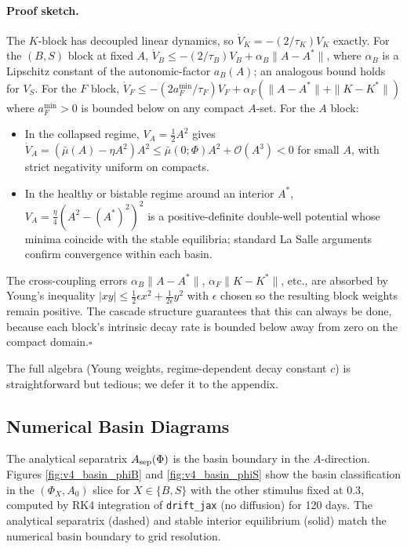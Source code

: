 \paragraph{Proof sketch.}
The $K$-block has decoupled linear dynamics, so $\dot V_K = -(2/\tau_K) V_K$ exactly. For the $(B, S)$ block at fixed $A$, $\dot V_B \le -(2/\tau_B) V_B + \alpha_B \|A - A^*\|$, where $\alpha_B$ is a Lipschitz constant of the autonomic-factor $a_B(A)$; an analogous bound holds for $V_S$. For the $F$ block, $\dot V_F \le -(2 a_F^{\min}/\tau_F) V_F + \alpha_F (\|A - A^*\| + \|K - K^*\|)$ where $a_F^{\min} > 0$ is bounded below on any compact $A$-set. For the $A$ block:
\begin{itemize}
  \item In the collapsed regime, $V_A = \tfrac12 A^2$ gives $\dot V_A = (\bar\mu(A) - \eta A^2) A^2 \le \bar\mu(0;\Phi) A^2 + \mathcal{O}(A^3) < 0$ for small $A$, with strict negativity uniform on compacts.
  \item In the healthy or bistable regime around an interior $A^*$, $V_A = \tfrac{\eta}{4}(A^2 - (A^*)^2)^2$ is a positive-definite double-well potential whose minima coincide with the stable equilibria; standard La Salle arguments confirm convergence within each basin.
\end{itemize}
The cross-coupling errors $\alpha_B \|A-A^*\|$, $\alpha_F \|K - K^*\|$, etc., are absorbed by Young's inequality $|xy| \le \tfrac12 \epsilon x^2 + \tfrac{1}{2\epsilon} y^2$ with $\epsilon$ chosen so the resulting block weights remain positive. The cascade structure guarantees that this can always be done, because each block's intrinsic decay rate is bounded below away from zero on the compact domain.\hfill$\square$

The full algebra (Young weights, regime-dependent decay constant $c$) is straightforward but tedious; we defer it to the appendix.

\subsection{Numerical Basin Diagrams} \label{sec:v4-basins}

The analytical separatrix $A_{\rm sep}(\Phi)$ is the basin boundary in the $A$-direction. Figures \ref{fig:v4_basin_phiB} and \ref{fig:v4_basin_phiS} show the basin classification in the $(\Phi_X, A_0)$ slice for $X \in \{B, S\}$ with the other stimulus fixed at $0.3$, computed by RK4 integration of \texttt{drift\_jax} (no diffusion) for 120 days. The analytical separatrix (dashed) and stable interior equilibrium (solid) match the numerical basin boundary to grid resolution.

